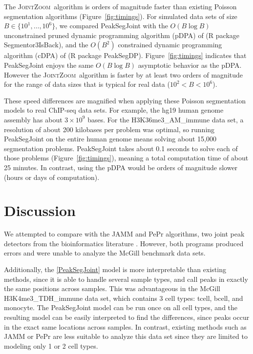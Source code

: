 \documentclass{article} %
\newcommand{\JointHeuristic}{\textsc{JointZoom}}
\begin{document}
The \JointHeuristic\ algorithm is orders of magnitude faster than
existing Poisson segmentation algorithms
(Figure~\ref{fig:timings}). For simulated data sets of size
$B\in\{10^1, \dots, 10^6\}$, we compared PeakSegJoint with the
$O(B\log B)$ unconstrained pruned dynamic programming algorithm (pDPA)
of \citet{Segmentor} (R package Segmentor3IsBack), and the $O(B^2)$
constrained dynamic programming algorithm (cDPA) of
\citet{HOCKING-PeakSeg} (R package
PeakSegDP). Figure~\ref{fig:timings} indicates that PeakSegJoint
enjoys the same $O(B \log B)$ asymptotic behavior as the pDPA. However
the \JointHeuristic\ algorithm is faster by at least two orders of
magnitude for the range of data sizes that is typical for real data
($10^2 < B < 10^6$).

These speed differences are magnified when applying these Poisson
segmentation models to real ChIP-seq data sets. For example, the hg19
human genome assembly has about $3\times 10^9$ bases. For the
H3K36me3\_AM\_immune data set, a resolution of about 200 kilobases per
problem was optimal, so running PeakSegJoint on the entire human
genome means solving about 15,000 segmentation problems. PeakSegJoint
takes about 0.1 seconds to solve each of those problems
(Figure~\ref{fig:timings}), meaning a total computation time of about
25 minutes. In contrast, using the pDPA would be orders of magnitude
slower (hours or days of computation).

\section{Discussion}

We attempted to compare with the JAMM and PePr algorithms, two joint
peak detectors from the bioinformatics literature \citep{JAMM,
  PePr}. However, both programs produced errors and were unable to
analyze the McGill benchmark data sets. 


Additionally, the \ref{PeakSegJoint} model is more interpretable than
existing methods, since it is able to handle several sample types, and
call peaks in exactly the same positions across samples. This was
advantageous in the McGill H3K4me3\_TDH\_immune data set, which
contains 3 cell types: tcell, bcell, and monocyte. The PeakSegJoint
model can be run once on all cell types, and the resulting model can
be easily interpreted to find the differences, since peaks occur in
the exact same locations across samples. In contrast, existing methods
such as JAMM or PePr are less suitable to analyze this data set since
they are limited to modeling only 1 or 2 cell types.
\end{document}
